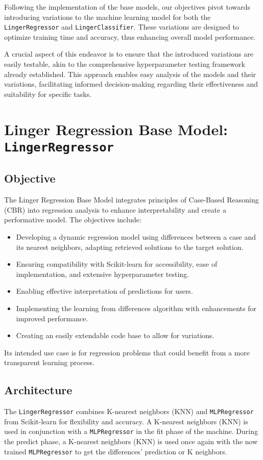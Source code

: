 \documentclass[a4paper, 12pt]{report}
\begin{document}
Following the implementation of the base models, our objectives pivot towards introducing variations to the machine learning model for both the \texttt{LingerRegressor} and \texttt{LingerClassifier}. 
These variations are designed to optimize training time and accuracy, thus enhancing overall model performance.

A crucial aspect of this endeavor is to ensure that the introduced variations are easily testable, akin to the comprehensive hyperparameter testing framework already established. 
This approach enables easy analysis of the models and their variations, facilitating informed decision-making regarding their effectiveness and suitability for specific tasks.

\section{Linger Regression Base Model: \texttt{LingerRegressor}}

\subsection{Objective}
The Linger Regression Base Model integrates principles of Case-Based Reasoning (CBR) into regression analysis to enhance interpretability and create a performative model. The objectives include:

\begin{itemize}
    \item Developing a dynamic regression model using differences between a case and its nearest neighbors, adapting retrieved solutions to the target solution.
    \item Ensuring compatibility with Scikit-learn for accessibility, ease of implementation, and extensive hyperparameter testing.
    \item Enabling effective interpretation of predictions for users.
    \item Implementing the learning from differences algorithm with enhancements for improved performance.
    \item Creating an easily extendable code base to allow for variations.
\end{itemize}

Its intended use case is for regression problems that could benefit from a more transparent learning process.

\subsection{Architecture}
The \texttt{LingerRegressor} combines K-nearest neighbors (KNN) and \texttt{MLPRegressor} from Scikit-learn for flexibility and accuracy. A K-nearest neighbors (KNN) is used in conjunction with a \texttt{MLPRegressor} in the fit phase of the machine. 
During the predict phase, a K-nearest neighbors (KNN) is used once again with the now trained \texttt{MLPRegressor} to get the differences' prediction or K neighbors.
\end{document}
